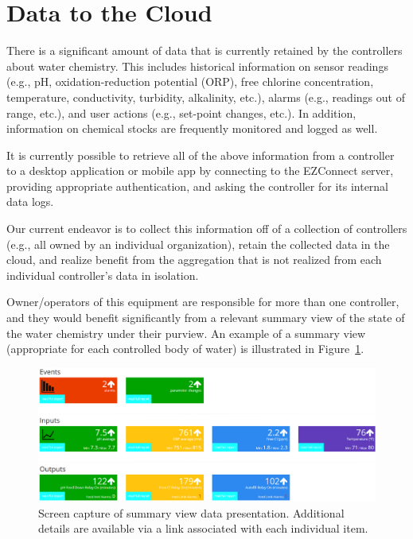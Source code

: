 \section{Data to the Cloud}
\label{sec:cloud}

There is a significant amount of data that is currently retained by
the controllers about water chemistry.  This includes historical
information on sensor readings (e.g., pH, oxidation-reduction potential (ORP),
free chlorine concentration, temperature, conductivity, turbidity,
alkalinity, etc.),
alarms (e.g., readings out of range, etc.), and user actions (e.g.,
set-point changes, etc.).
In addition, information on chemical stocks are frequently monitored
and logged as well.

It is currently possible to retrieve all of the above information from
a controller to a desktop application or mobile app by connecting to
the EZConnect server, providing appropriate authentication, and asking
the controller for its internal data logs.

Our current endeavor is
to collect this information off of a collection of controllers (e.g., all
owned by an individual organization), retain the collected data in
the cloud, and realize benefit from the aggregation that is not realized
from each individual controller's data in isolation.

Owner/operators of this equipment are responsible for 
more than one controller, and they would benefit significantly from a relevant
summary view of the state of the water chemistry under their purview.
An example of a summary view (appropriate for each controlled body of water)
is illustrated in Figure~\ref{screenshot}.

\begin{figure}[htbp]
 \center
\includegraphics[width=\columnwidth]{screenshot}
    \caption{Screen capture of summary view data presentation. Additional
details are available via a link associated with each individual item.}
    \label{screenshot}
\end{figure}

